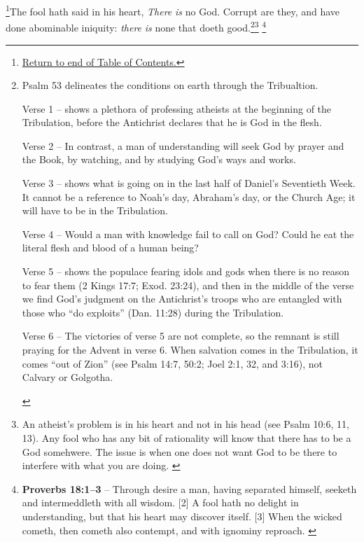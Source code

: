 \footnote{\textcolor[cmyk]{0.99998,1,0,0}{\hyperlink{TOC}{Return to end of Table of Contents.}}}\textcolor[cmyk]{0.99998,1,0,0}{The fool hath said in his heart, \emph{There} \emph{is} no God. Corrupt are they, and have done abominable iniquity: \emph{there} \emph{is} none that doeth good.}\footnote{Psalm 53 delineates the conditions on earth through the Tribualtion. \begin{compactenum}
\item Verse 1 -- shows a plethora of professing atheists at the beginning of the Tribulation, before the Antichrist declares that he is God in the flesh.
\item  Verse 2 -- In contrast, a man of understanding will seek God by prayer and the Book, by watching, and by studying God’s ways and works.
\item Verse 3 -- shows what is going on in the last half of Daniel’s Seventieth Week. It cannot be a reference to Noah’s day, Abraham’s day, or the Church Age; it will have to be in the Tribulation.
\item Verse 4 -- Would a man with knowledge fail to call on God? Could he eat the literal flesh and blood of a human being?
\item Verse 5 -- shows the populace fearing idols and gods when there is no reason to fear them (2 Kings 17:7; Exod. 23:24), and then in the middle of the verse we find God’s judgment on the Antichrist’s troops who are entangled with those who ``do exploits'' (Dan. 11:28) during the Tribulation.
\item Verse 6 -- The victories of verse 5 are not complete, so the remnant is still praying for the Advent in verse 6. When salvation comes in the Tribulation, it comes ``out of Zion'' (see Psalm 14:7, 50:2; Joel 2:1, 32, and 3:16), not Calvary or Golgotha.
\end{compactenum}}\footnote{An atheist's problem is in his heart and not in his head  (see Psalm 10:6, 11, 13). Any fool who has any bit of rationality will know that there has to be a God somehwere. The issue is when one does not want God to be there to interfere with what you are doing. \cite{Ruckman1992Psalms}} \footnote{\textbf{Proverbs 18:1--3} -- Through desire a man, having separated himself, seeketh and intermeddleth with all wisdom.  [2]  A fool hath no delight in understanding, but that his heart may discover itself. [3] When the wicked cometh, then cometh also contempt, and with ignominy reproach. \cite{Ruckman1992Psalms} }
